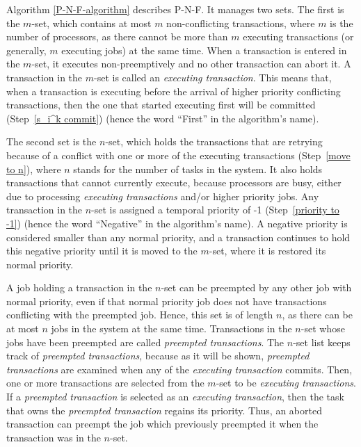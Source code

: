 Algorithm \ref{P-N-F-algorithm} describes P-N-F. It
manages two sets. The first is the $m$-set, which contains at most $m$ non-conflicting
transactions, where $m$ is the number of processors, as
there cannot be more than $m$ executing transactions (or generally,
$m$ executing jobs) at the same time. When a transaction is entered
in the $m$-set, it executes non-preemptively and no other transaction
can abort it. A transaction in the $m$-set is called an \emph{executing
transaction}. 
This means that, when a transaction is executing before
the arrival of higher priority conflicting transactions, then the
one that started executing first will be committed (Step~\ref{s_i^k commit}) (hence the word ``First'' in the algorithm's name). 

The second set is the $n$-set, which holds the transactions
that are retrying because of a conflict with one or more of the executing
transactions (Step~\ref{move to n}), where $n$ stands for
the number of tasks in the system. It also holds transactions that
cannot currently execute, because processors are busy, either due to processing \emph{executing transactions}
and/or higher priority jobs. Any transaction in the $n$-set is assigned a temporal
priority of -1 (Step~\ref{priority to -1}) (hence the word 
``Negative'' in the algorithm's name). A negative priority
is considered smaller than any normal priority, and a transaction
continues to hold this negative priority until it is moved to the $m$-set, where it is restored its normal priority.


A job holding a transaction in the $n$-set can be preempted by any other job with normal priority, even if that normal priority job does not have transactions conflicting with the preempted job. Hence, this set is of length $n$, as there can be at most $n$ jobs in the system at the
same time. Transactions in the $n$-set whose jobs have been preempted are called \emph{preempted transactions}.
The $n$-set list keeps track of \emph{preempted transactions}, because
as it will be shown, \emph{preempted transactions} are examined when any of the
\emph{executing transaction} commits. Then, one or more transactions are selected from the $m$-set to be \emph{executing transactions}. If a \emph{preempted transaction} is selected as an \emph{executing transaction}, then the task that owns the \emph{preempted transaction} regains its priority. Thus, an aborted transaction can preempt the job which previously preempted it when the transaction was in the $n$-set.

